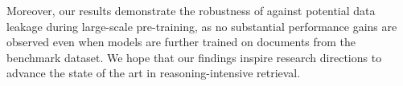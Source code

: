 Moreover, our results demonstrate the robustness of \ours against potential data leakage during large-scale pre-training, as no substantial performance gains are observed even when models are further trained on documents from the benchmark dataset. 
We hope that our findings inspire research directions to advance the state of the art in reasoning-intensive retrieval.